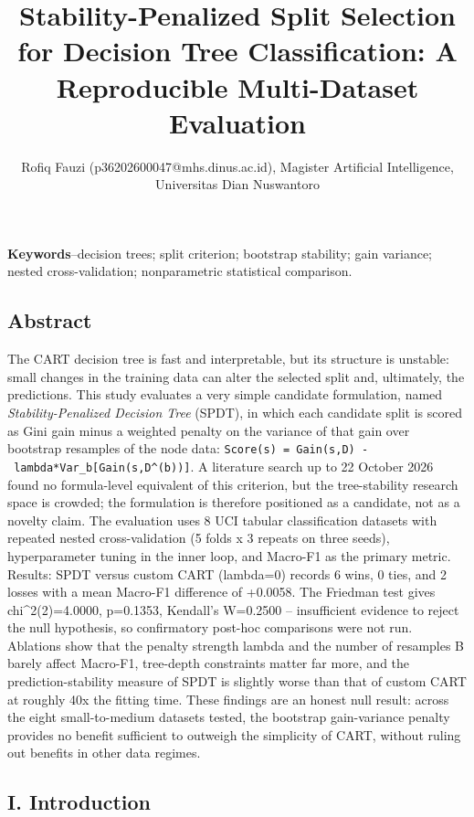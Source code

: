 \documentclass[
  conference]{IEEEtran}
\title{Stability-Penalized Split Selection for Decision Tree
Classification: A Reproducible Multi-Dataset Evaluation}
\author{Rofiq Fauzi (p36202600047@mhs.dinus.ac.id), Magister Artificial
Intelligence, Universitas Dian Nuswantoro}
\date{}
\begin{document}
\maketitle

\textbf{Keywords}--decision trees; split criterion; bootstrap stability;
gain variance; nested cross-validation; nonparametric statistical
comparison.

\subsection{Abstract}\label{abstract}

The CART decision tree is fast and interpretable, but its structure is
unstable: small changes in the training data can alter the selected
split and, ultimately, the predictions. This study evaluates a very
simple candidate formulation, named \emph{Stability-Penalized Decision
Tree} (SPDT), in which each candidate split is scored as Gini gain minus
a weighted penalty on the variance of that gain over bootstrap resamples
of the node data:
\texttt{Score(s)\ =\ Gain(s,D)\ -\ lambda*Var\_b{[}Gain(s,D\^{}(b)){]}}.
A literature search up to 22 October 2026 found no formula-level
equivalent of this criterion, but the tree-stability research space is
crowded; the formulation is therefore positioned as a candidate, not as
a novelty claim. The evaluation uses 8 UCI tabular classification
datasets with repeated nested cross-validation (5 folds x 3 repeats on
three seeds), hyperparameter tuning in the inner loop, and Macro-F1 as
the primary metric. Results: SPDT versus custom CART (lambda=0) records
6 wins, 0 ties, and 2 losses with a mean Macro-F1 difference of +0.0058.
The Friedman test gives chi\^{}2(2)=4.0000, p=0.1353, Kendall's W=0.2500
-- insufficient evidence to reject the null hypothesis, so confirmatory
post-hoc comparisons were not run. Ablations show that the penalty
strength lambda and the number of resamples B barely affect Macro-F1,
tree-depth constraints matter far more, and the prediction-stability
measure of SPDT is slightly worse than that of custom CART at roughly
40x the fitting time. These findings are an honest null result: across
the eight small-to-medium datasets tested, the bootstrap gain-variance
penalty provides no benefit sufficient to outweigh the simplicity of
CART, without ruling out benefits in other data regimes.

\subsection{I. Introduction}\label{i.-introduction}
\end{document}
